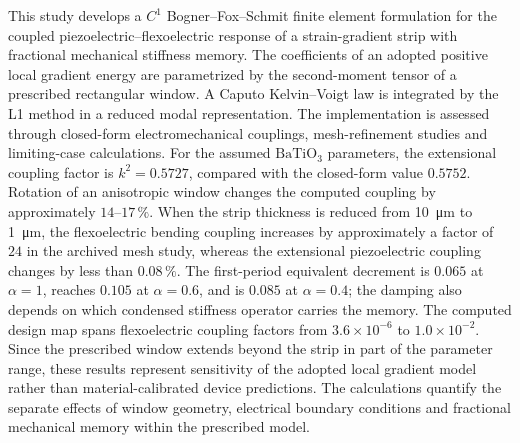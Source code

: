 This study develops a $C^1$ Bogner--Fox--Schmit finite element formulation
for the coupled piezoelectric--flexoelectric response of a strain-gradient
strip with fractional mechanical stiffness memory. The coefficients of an
adopted positive local gradient energy are parametrized by the second-moment
tensor of a prescribed rectangular window. A Caputo Kelvin--Voigt law is
integrated by the L1 method in a reduced modal representation. The
implementation is assessed through closed-form electromechanical couplings,
mesh-refinement studies and limiting-case calculations. For the assumed
$\mathrm{BaTiO_3}$ parameters, the extensional coupling factor is
$k^2=0.5727$, compared with the closed-form value $0.5752$. Rotation of an
anisotropic window changes the computed coupling by approximately $14$--$17\,\%$.
When the strip thickness is reduced from \SI{10}{\micro\meter} to
\SI{1}{\micro\meter}, the flexoelectric bending coupling increases by
approximately a factor of $24$ in the archived mesh study, whereas the extensional piezoelectric
coupling changes by less than $0.08\,\%$. The first-period equivalent
decrement is $0.065$ at $\alpha=1$, reaches $0.105$ at $\alpha=0.6$,
and is $0.085$ at $\alpha=0.4$;
the damping also depends on which condensed stiffness operator carries the
memory. The computed design map spans flexoelectric coupling factors from
$3.6\times10^{-6}$ to $1.0\times10^{-2}$. Since the prescribed window
extends beyond the strip in part of the parameter range, these results
represent sensitivity of the adopted local gradient model rather than
material-calibrated device predictions. The calculations quantify the separate effects of window geometry,
electrical boundary conditions and fractional mechanical memory within
the prescribed model.
